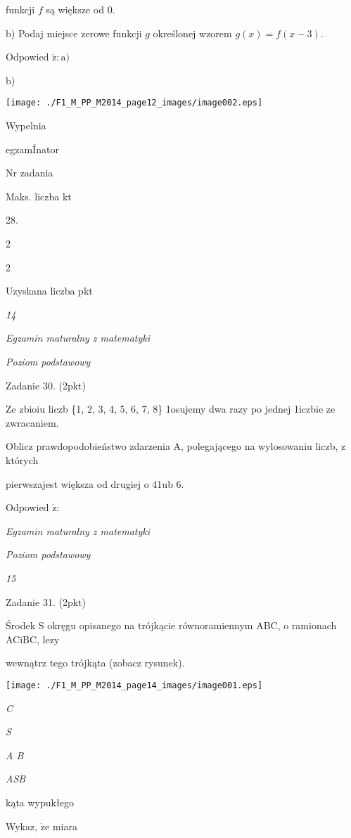 \documentclass[a4paper,12pt]{article}
\begin{document}
funkcji $f$ są większe od 0.

b) Podaj miejsce zerowe funkcji $g$ określonej wzorem $g(x)=f(x-3).$

Odpowied $\acute{\mathrm{z}}:\mathrm{a})$

b)
\begin{center}
\texttt{[image: ./F1\_M\_PP\_M2014\_page12\_images/image002.eps]}
\end{center}
Wypelnia

egzamÍnator

Nr zadania

Maks. liczba kt

28.

2

2

Uzyskana liczba pkt





{\it 14}

{\it Egzamin maturalny z matematyki}

{\it Poziom podstawowy}

Zadanie 30. (2pkt)

Ze zbioiu liczb \{1, 2, 3, 4, 5, 6, 7, 8\} 1osujemy dwa razy po jednej 1iczbie ze zwracaniem.

Oblicz prawdopodobieństwo zdarzenia A, polegającego na wylosowaniu liczb, z których

pierwszajest większa od drugiej o 41ub 6.

Odpowied $\acute{\mathrm{z}}$:





{\it Egzamin maturalny z matematyki}

{\it Poziom podstawowy}

{\it 15}

Zadanie 31. (2pkt)

Środek S okręgu opisanego na trójkącie równoramiennym ABC, o ramionach ACiBC, lezy

wewnątrz tego trójkąta (zobacz rysunek).
\begin{center}
\texttt{[image: ./F1\_M\_PP\_M2014\_page14\_images/image001.eps]}
\end{center}
{\it C}

{\it S}

{\it A  B}

{\it ASB}

kąta wypukłego

Wykaz, $\dot{\mathrm{z}}\mathrm{e}$ miara
\end{document}
